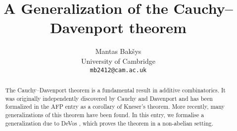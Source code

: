 \documentclass[11pt,a4paper]{article}
\begin{document}
\title{A Generalization of the Cauchy--Davenport theorem}
\author{Mantas Bak\v{s}ys \\
University of Cambridge\\
\texttt{mb2412@cam.ac.uk}}

\maketitle
                                                             
\begin{abstract}
The Cauchy--Davenport theorem is a fundamental result in additive combinatorics.
It was originally independently discovered by Cauchy \cite{cauchy1812recherches} and Davenport \cite{davenport} and has been formalized in the AFP entry \cite{Kneser_Cauchy_Davenport-AFP} as a corollary of Kneser's theorem.
More recently, many generalizations of this theorem have been found. In this entry, we formalise a generalization due to DeVos \cite{DeVos2016OnAG}, which proves the theorem in a non-abelian setting.
\end{abstract}
\newpage
\tableofcontents

\newpage






\end{document}

